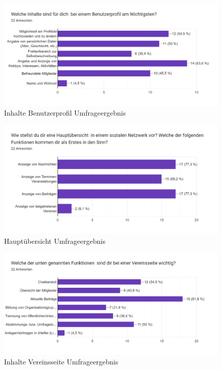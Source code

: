 \begin{figure}[!htb]
    \centering
    \includegraphics[width=1\textwidth]{figures/daniel/Bild-5.png}
    \caption[shortcaption]{Inhalte Benutzerprofil Umfrageergebnis}
    \label{fig:bild5}
\end{figure}

\begin{figure}[!htb]
    \centering
    \includegraphics[width=1\textwidth]{figures/daniel/Bild-6.png}
    \caption[shortcaption]{Hauptübersicht Umfrageergebnis}
    \label{fig:bild6}
\end{figure}

\begin{figure}[!htb]
    \centering
    \includegraphics[width=1\textwidth]{figures/daniel/Bild-7.png}
    \caption[shortcaption]{Inhalte Vereinsseite Umfrageergebnis}
    \label{fig:bild7}
\end{figure}

